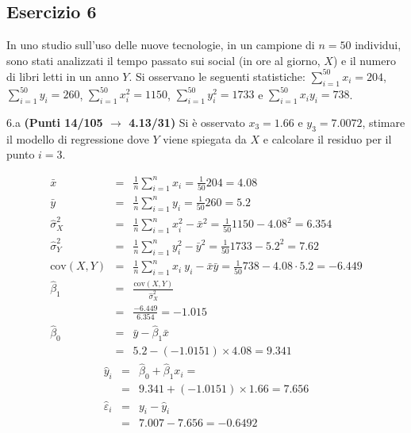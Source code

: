 \documentclass[
  11pt,
]{book}
\theoremstyle{mytheoremstyle}
\theoremstyle{mydefstyle}
\newenvironment{sol}
  {
  \begin{tcolorbox}[enhanced,breakable,arc=0.1mm,boxrule=1pt,colback=white,colframe=iblue,
  title=\bf \fontfamily{lmss}\selectfont \hspace{.5 cm} Soluzione,drop fuzzy shadow]

}{
\end{tcolorbox}
  }
\begin{document}
\subsection{Esercizio 6}\label{esercizio-6-32}

In uno studio sull'uso delle nuove tecnologie, in un campione di \(n=50\) individui, sono stati analizzati il tempo passato sui social (in ore al giorno, \(X\)) e il numero di libri letti in un anno \(Y\).
Si osservano le seguenti statistiche:
\(\sum_{i=1}^{50}x_i=204\), \(\sum_{i=1}^{50}y_i=260\),
\(\sum_{i=1}^{50}x_i^2=1150\), \(\sum_{i=1}^{50}y_i^2=1733\) e \(\sum_{i=1}^{50}x_iy_i=738\).

6.a \textbf{(Punti 14/105 \(\rightarrow\) 4.13/31)} Si è osservato \(x_3=1.66\) e \(y_3=7.0072\), stimare il modello di regressione dove \(Y\) viene spiegata da \(X\) e calcolare il residuo per il punto \(i=3\).

\begin{sol}
\begin{eqnarray*}
           \bar x &=&\frac 1 n\sum_{i=1}^n x_i = \frac {1}{ 50 }  204 =  4.08 \\
           \bar y &=&\frac 1 n\sum_{i=1}^n y_i = \frac {1}{ 50 }  260 =  5.2 \\
           \hat\sigma_X^2&=&\frac 1 n\sum_{i=1}^n x_i^2-\bar x^2=\frac {1}{ 50 }  1150  - 4.08 ^2= 6.354 \\
           \hat\sigma_Y^2&=&\frac 1 n\sum_{i=1}^n y_i^2-\bar y^2=\frac {1}{ 50 }  1733  - 5.2 ^2= 7.62 \\
           \text{cov}(X,Y)&=&\frac 1 n\sum_{i=1}^n x_i~y_i-\bar x\bar y=\frac {1}{ 50 }  738 - 4.08 \cdot 5.2 = -6.449 \\
           \hat\beta_1 &=& \frac{\text{cov}(X,Y)}{\hat\sigma_X^2} \\
                    &=& \frac{ -6.449 }{ 6.354 }  =  -1.015 \\
           \hat\beta_0 &=& \bar y - \hat\beta_1 \bar x\\
                    &=&  5.2 - (-1.0151) \times  4.08 = 9.341 
         \end{eqnarray*}\begin{eqnarray*}
\hat y_i &=&\hat\beta_0+\hat\beta_1 x_i=\\ 
&=& 9.341 + (-1.0151) \times 1.66 = 7.656 \\ 
\hat \varepsilon_i &=& y_i-\hat y_i\\ 
&=& 7.007 - 7.656 = -0.6492  
\end{eqnarray*}

\end{sol}
\end{document}
